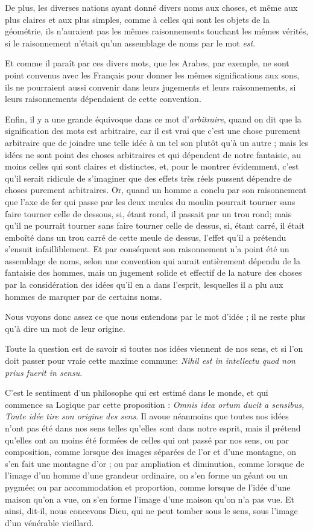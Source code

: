 De plus, les diverses nations ayant donné divers noms aux choses, et même aux plus claires et aux plus simples, comme à celles qui sont les objets de la géométrie, ils n'auraient pas les mêmes raisonnements touchant les mêmes vérités, si le raisonnement n'était qu'un assemblage de noms par le mot \emph{est}.

Et comme il paraît par ces divers mots, que les Arabes, par exemple, ne sont point convenus avec les Français pour donner les mêmes significations aux sons, ils ne pourraient aussi convenir dans leurs jugements et leurs raisonnements, si leurs raisonnements dépendaient de cette convention.

Enfin, il y a une grande équivoque dans ce mot d'\emph{arbitraire}, quand on dit que la signification des mots est arbitraire, car il est vrai que c'est une chose purement arbitraire que de joindre une telle idée à un tel son plutôt qu'à un autre ; mais les idées ne sont point des choses arbitraires et qui dépendent de notre fantaisie, au moins celles qui sont claires et distinctes, et, pour le montrer évidemment, c'est qu'il serait ridicule de s'imaginer que des effets très réels pussent dépendre de choses purement arbitraires. Or, quand un homme a conclu par son raisonnement que l'axe de fer qui passe par les deux meules du moulin pourrait tourner sans faire tourner celle de dessous, si, étant rond, il passait par un trou rond; mais qu'il ne pourrait tourner sans faire tourner celle de dessus, si, étant carré, il était emboîté dans un trou carré de cette meule de dessus, l'effet qu'il a prétendu s'ensuit infailliblement. Et par conséquent son raisonnement n'a point été un assemblage de noms, selon une convention qui aurait entièrement dépendu de la fantaisie des hommes, mais un jugement solide et effectif de la nature des choses par la considération des idées qu'il en a dans l'esprit, lesquelles il a plu aux hommes de marquer par de certains noms.

Nous voyons donc assez ce que nous entendons par le mot d'idée ; il ne reste plus qu'à dire un mot de leur origine.

Toute la question est de savoir si toutes nos idées viennent de nos sens, et si l'on doit passer pour vraie cette maxime commune: \emph{Nihil est in intellectu quod non prius fuerit in sensu}.

C'est le sentiment d'un philosophe qui est estimé dans le monde, et qui commence sa Logique par cette proposition : \emph{Omnis idea ortum ducit a sensibus, Toute idée tire son origine des sens}. Il avoue néanmoins que toutes nos idées n'ont pas été dans nos sens telles qu'elles sont dans notre esprit, mais il prétend qu'elles ont au moins été formées de celles qui ont passé par nos sens, ou par composition, comme lorsque des images séparées de l'or et d'une montagne, on s'en fait une montagne d'or ; ou par ampliation et diminution, comme lorsque de l'image d'un homme d'une grandeur ordinaire, on s'en forme un géant ou un pygmée; ou par accommodation et proportion, comme lorsque de l'idée d'une maison qu'on a vue, on s'en forme l'image d'une maison qu'on n'a pas vue. Et ainsi, dit-il, nous concevons Dieu, qui ne peut tomber sous le sens, sous l'image d'un vénérable vieillard.

